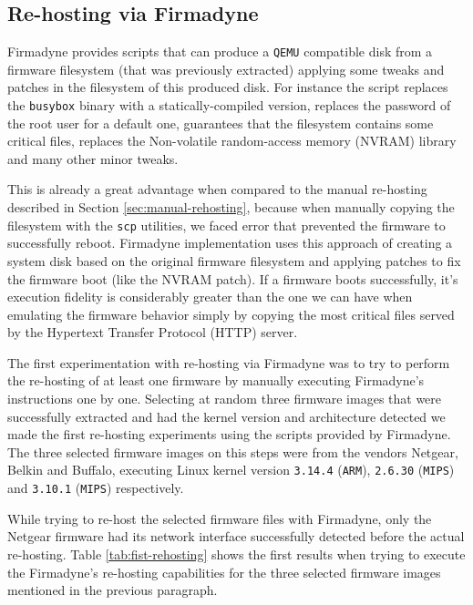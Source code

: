 \subsection{Re-hosting via Firmadyne}

Firmadyne provides scripts that can produce a {\tt QEMU} compatible disk from a firmware filesystem (that was previously extracted) applying some tweaks and patches in the filesystem of this produced disk. For instance the script replaces the {\tt busybox} binary with a statically-compiled version, replaces the password of the root user for a default one, guarantees that the filesystem contains some critical files, replaces the Non-volatile random-access memory (NVRAM) library and many other minor tweaks.

This is already a great advantage when compared to the manual re-hosting described in Section \ref{sec:manual-rehosting}, because when manually copying the filesystem with the {\tt scp} utilities, we faced error that prevented the firmware to successfully reboot. Firmadyne implementation uses this approach of creating a system disk based on the original firmware filesystem and applying patches to fix the firmware boot (like the NVRAM patch). If a firmware boots successfully, it's execution fidelity is considerably greater than the one we can have when emulating the firmware behavior simply by copying the most critical files served by the Hypertext Transfer Protocol (HTTP) server.


The first experimentation with re-hosting via Firmadyne was to try to perform the re-hosting of at least one firmware by manually executing Firmadyne's instructions one by one. Selecting at random three firmware images that were successfully extracted and had the kernel version and architecture detected we made the first re-hosting experiments using the scripts provided by Firmadyne. The three selected firmware images on this steps were from the vendors Netgear, Belkin and Buffalo, executing Linux kernel version {\tt 3.14.4} ({\tt ARM}), {\tt 2.6.30} ({\tt MIPS}) and {\tt 3.10.1} ({\tt MIPS}) respectively.

While trying to re-host the selected firmware files with Firmadyne, only the Netgear firmware had its network interface successfully detected before the actual re-hosting. Table \ref{tab:fist-rehosting} shows the first results when trying to execute the Firmadyne's re-hosting capabilities for the three selected firmware images mentioned in the previous paragraph.

